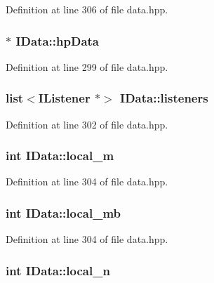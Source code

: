 Definition at line 306 of file data.hpp.\hypertarget{class_i_data_a4c5003567bfc7b0e63f10b693858fa5c}{
\subsubsection[{hpData}]{$\ast$ {\bf IData::hpData}}}
\label{class_i_data_a4c5003567bfc7b0e63f10b693858fa5c}


Definition at line 299 of file data.hpp.\hypertarget{class_i_data_aa7d44f5d83938ee056221867600fd7db}{
\subsubsection[{listeners}]{\setlength{\rightskip}{0pt plus 5cm}list$<${\bf IListener} $\ast$$>$ {\bf IData::listeners}}}
\label{class_i_data_aa7d44f5d83938ee056221867600fd7db}


Definition at line 302 of file data.hpp.\hypertarget{class_i_data_aff1391e4b21d315fe742aca22bfa5aed}{
\subsubsection[{local\_\-m}]{\setlength{\rightskip}{0pt plus 5cm}int {\bf IData::local\_\-m}}}
\label{class_i_data_aff1391e4b21d315fe742aca22bfa5aed}


Definition at line 304 of file data.hpp.\hypertarget{class_i_data_a3158c94ab8af22d09004ff24c3db8205}{
\subsubsection[{local\_\-mb}]{\setlength{\rightskip}{0pt plus 5cm}int {\bf IData::local\_\-mb}}}
\label{class_i_data_a3158c94ab8af22d09004ff24c3db8205}


Definition at line 304 of file data.hpp.\hypertarget{class_i_data_a521517b4c122b1260851e3cec3f8e83f}{
\subsubsection[{local\_\-n}]{\setlength{\rightskip}{0pt plus 5cm}int {\bf IData::local\_\-n}}}
\label{class_i_data_a521517b4c122b1260851e3cec3f8e83f}


